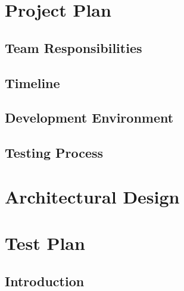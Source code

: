\documentclass[oneside]{book}
\begin{document}



\chapter{Project Plan}

\section{Team Responsibilities}

\section{Timeline}

\section{Development Environment}

\section{Testing Process}


\chapter{Architectural Design}



\chapter{Test Plan}

\section{Introduction}
\end{document}

